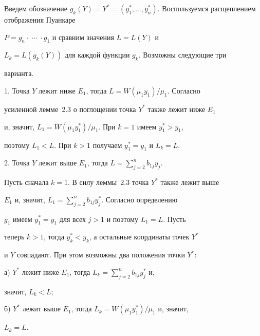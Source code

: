 \begin{pf} Введем обозначение $g_k(Y)=Y^*=(y_1^*,\dotsc,


y_n^*)$. Воспользуемся расщеплением отображения Пуанкаре 


$P=g_n\cdot\;\dotsb\;\cdot g_1$ и сравним значения $L=L(Y)$ и 


$L_k=L(g_k(Y))$ для каждой функции $g_k$. Возможны следующие три 


варианта.


\medskip





1. Точка $Y$ лежит ниже $E_1$, тогда $L=W(\mu_1y_1)/\mu_1$. Согласно 


усиленной лемме~2.3 о поглощении точка $Y^*$ также лежит ниже $E_1$ 


и, значит, $L_1=W(\mu_1y_1^*)/\mu_1$. При $k=1$ имеем $y_1^*>y_1$, 


поэтому $L_1<L$. При $k>1$ получаем $y_1^*=y_1$ и $L_k=L$.


\medskip





2. Точка $Y$ лежит выше $E_1$, тогда $L=\sum\limits_{j=2}^n b_{1j}y_j$. 


Пусть сначала $k=1$. В силу леммы~2.3 точка $Y^*$ также лежит выше 


$E_1$ и, значит, $L_1=\sum\limits_{j=2}^nb_{1j}y_j^*$. Согласно определению 


$g_1$ имеем $y_1^*=y_1$ для всех $j>1$ и поэтому $L_1=L$. Пусть 


теперь $k>1$, тогда $y_k^*<y_k$, а остальные координаты точек $Y^*$ 


и $Y$ совпадают. При этом возможны два положения точки $Y^*$:


\smallskip





а) $Y^*$ лежит ниже $E_1$, тогда $L_k=\sum\limits_{j=2}^nb_{1j}y_j^*$ и, 


значит, $L_k<L$;


\smallskip





б) $Y^*$ лежит выше $E_1$, тогда $L_k=W(\mu_1y_1^*)/\mu_1$ и, значит,


$L_k=L$.


\medskip






\end{pf}
